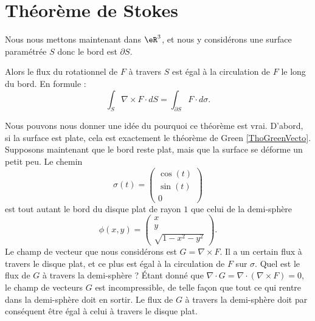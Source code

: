 \section{Théorème de Stokes}

Nous nous mettons maintenant dans $\eR^3$, et nous y considérons une surface paramétrée $S$ donc le bord est $\partial S$. 

\begin{theorem}     \label{THOooIRYTooFEyxif}
    Alors le flux du rotationnel de $F$ à travers $S$ est égal à la circulation de $F$ le long du bord. En formule :
    \begin{equation}
        \int_S\nabla\times F\cdot dS=\int_{\partial S} F\cdot d\sigma.
    \end{equation}
\end{theorem}

Nous pouvons nous donner une idée du pourquoi ce théorème est vrai. D'abord, si la surface est plate, cela est exactement le théorème de Green \ref{ThoGreenVecto}. Supposons maintenant que le bord reste plat, mais que la surface se déforme un petit peu. Le chemin
\begin{equation}
    \sigma(t)=\begin{pmatrix}
        \cos(t)    \\ 
        \sin(t)    \\ 
        0    
    \end{pmatrix}
\end{equation}
est tout autant le bord du disque plat de rayon $1$ que celui de la demi-sphère
\begin{equation}
    \phi(x,y)=\begin{pmatrix}
        x    \\ 
        y    \\ 
        \sqrt{1-x^2-y^2}    
    \end{pmatrix}.
\end{equation}
Le champ de vecteur que nous considérons est $G=\nabla\times F$. Il a un certain flux à travers le disque plat, et ce plus est égal à la circulation de $F$ sur $\sigma$. Quel est le flux de $G$ à travers la demi-sphère ? Étant donné que $\nabla\cdot G=\nabla\cdot(\nabla\times F)=0$, le champ de vecteurs $G$ est incompressible, de telle façon que tout ce qui rentre dans la demi-sphère doit en sortir. Le flux de $G$ à travers la demi-sphère doit par conséquent être égal à celui à travers le disque plat.


